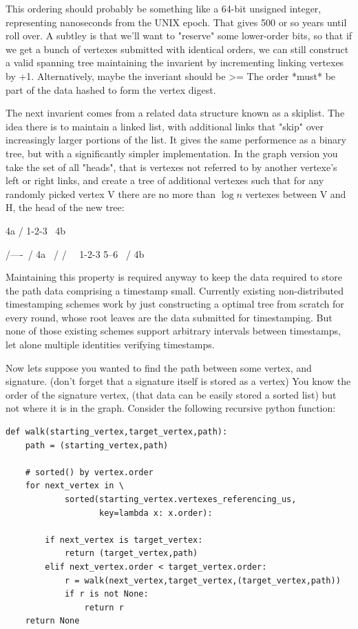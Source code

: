 \documentclass{article}
\begin{document}
This ordering should probably be something like a 64-bit unsigned
integer, representing nanoseconds from the UNIX epoch. That gives 500 or
so years until roll over. A subtley is that we'll want to "reserve" some
lower-order bits, so that if we get a bunch of vertexes submitted with
identical orders, we can still construct a valid spanning tree
maintaining the invarient by incrementing linking vertexes by +1.
Alternatively, maybe the inveriant should be >= The order *must* be
part of the data hashed to form the vertex digest. 


The next invarient comes from a related data structure known as a
skiplist. The idea there is to maintain a linked list, with additional
links that "skip" over increasingly larger portions of the list. It
gives the same performence as a binary tree, but with a significantly
simpler implementation. In the graph version you take the set of all
"heads", that is vertexes not referred to by another vertexe's left or
right links, and create a tree of additional vertexes such that for any
randomly picked vertex V there are no more than $\log n$ vertexes between
V and H, the head of the new tree:

      4a
     /
1-2-3
     \
      4b


    /----\
   /  4a  \
  /  /  \  \
1-2-3    5--6
     \  /
      4b

Maintaining this property is required anyway to keep the data required
to store the path data comprising a timestamp small. Currently existing
non-distributed timestamping schemes work by just constructing a optimal
tree from scratch for every round, whose root leaves are the data
submitted for timestamping. But none of those existing schemes support
arbitrary intervals between timestamps, let alone multiple identities
verifying timestamps.


Now lets suppose you wanted to find the path between some vertex, and
signature. (don't forget that a signature itself is stored as a vertex)
You know the order of the signature vertex, (that data can be easily
stored a sorted list) but not where it is in the graph. Consider the
following recursive python function:

\begin{verbatim}
def walk(starting_vertex,target_vertex,path):
    path = (starting_vertex,path)

    # sorted() by vertex.order
    for next_vertex in \
            sorted(starting_vertex.vertexes_referencing_us,
                   key=lambda x: x.order):

        if next_vertex is target_vertex:
            return (target_vertex,path)
        elif next_vertex.order < target_vertex.order:
            r = walk(next_vertex,target_vertex,(target_vertex,path))
            if r is not None:
                return r
    return None
\end{verbatim}
\end{document}
